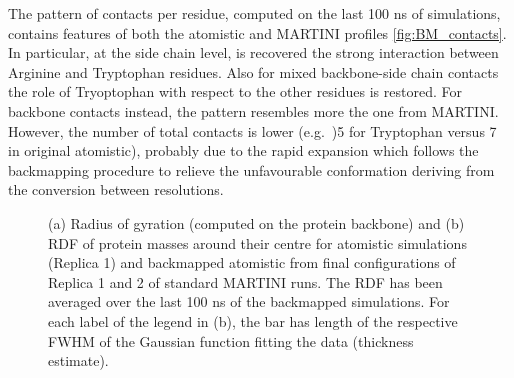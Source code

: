 The pattern of contacts per residue, computed on the last 100 ns of simulations, contains features of both the atomistic and MARTINI profiles \ref{fig:BM_contacts}.
%
In particular, at the side chain level, is recovered the strong interaction between Arginine and Tryptophan residues. Also for mixed backbone-side chain contacts the role of Tryoptophan with respect to the other residues is restored. For backbone contacts instead, the pattern resembles more the one from MARTINI. However, the number of total contacts is lower (e.g.\ )5 for Tryptophan versus 7 in original atomistic), probably due to the rapid expansion which follows the backmapping procedure to relieve the unfavourable conformation deriving from the conversion between resolutions.
%
\begin{figure}[p!]
\centering
{}
\caption[Backmapping simulations: R$_g$ and RDF]{(a) Radius of gyration (computed on the protein backbone) and (b) RDF of protein masses around their centre for atomistic simulations (Replica 1) and backmapped atomistic from final configurations of Replica 1 and 2 of standard MARTINI runs. The RDF has been averaged over the last 100 ns of the backmapped simulations. For each label of the legend in (b), the bar has length of the respective FWHM of the Gaussian function fitting the data (thickness estimate). }

\end{figure}

